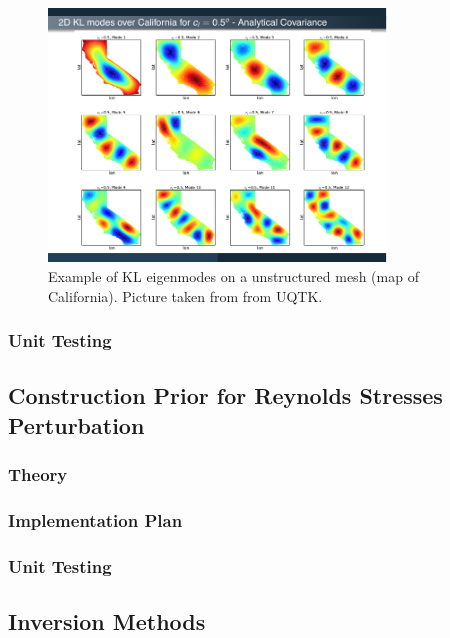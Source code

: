 \documentclass[paper = letter, fontsize = 11pt]{scrartcl} %
\begin{document}
\begin{enumerate}
\begin{figure}[htbp]
  \centering
  \includegraphics[width=0.8\textwidth]{KL-example-unstructured.pdf}
  \caption{Example of KL eigenmodes on a unstructured mesh (map of California). Picture taken from from UQTK.}
  \label{fig:cali}
\end{figure}

\end{enumerate}

\subsubsection{Unit Testing}


\subsection{Construction Prior for Reynolds Stresses Perturbation}

\subsubsection{Theory}
\subsubsection{Implementation Plan}
\subsubsection{Unit Testing}



\subsection{Inversion Methods}
\end{document}
